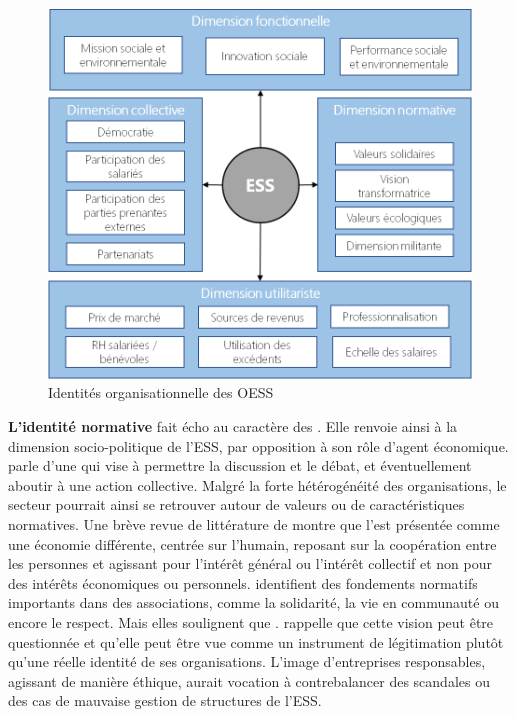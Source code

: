         \begin{figure}
            \centering
            \caption{Identités organisationnelle des OESS}
            \label{figure:dim_ess}
            \includegraphics[width=\linewidth]{fig/dim_ess.png}
        \end{figure}

        \textbf{L'identité normative} fait écho au caractère  des \oess. Elle renvoie ainsi à la dimension socio-politique de l'ESS, par opposition à son rôle d'agent économique. \textcite[][p.293]{young2001organizational} parle d'une  qui vise à permettre la discussion et le débat, et éventuellement aboutir à une action collective.
        Malgré la forte hétérogénéité des organisations, le secteur pourrait ainsi se retrouver autour de valeurs ou de caractéristiques normatives. Une brève revue de littérature  de \textcite{mariaux2015leconomie} montre que l'\ess est présentée comme une économie différente, centrée sur l'humain, reposant sur la coopération entre les personnes et agissant pour l'intérêt général ou l'intérêt collectif et non pour des intérêts économiques ou personnels. \textcite{auger2014les} identifient des fondements normatifs importants dans des associations, comme la solidarité, la vie en communauté ou encore le respect. Mais elles soulignent que . \textcite{chedotel2004ambivalence} rappelle que cette vision peut être questionnée et qu'elle peut être vue comme un instrument de légitimation plutôt qu'une réelle identité de ses organisations. L'image d'entreprises responsables, agissant de manière éthique, aurait vocation à contrebalancer des scandales ou des cas de mauvaise gestion de structures de l'ESS. \\

